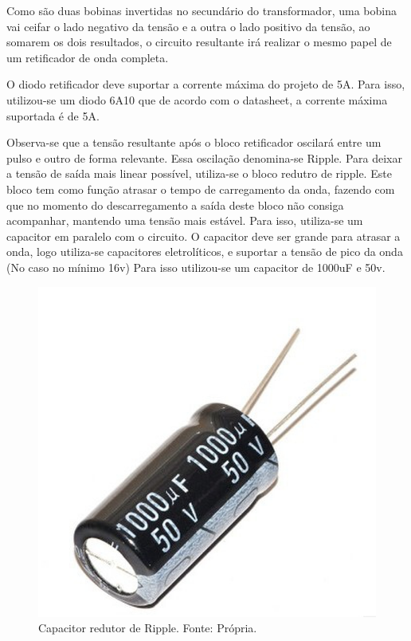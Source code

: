         Como são duas bobinas invertidas no secundário do transformador, uma bobina 					vai ceifar o lado negativo da tensão e a outra o lado positivo da tensão, ao 					somarem os dois resultados, o circuito resultante irá realizar o mesmo papel 					de um retificador de onda completa.
        
        O diodo retificador deve suportar a corrente máxima do projeto de 5A. Para 						isso, utilizou-se um diodo 6A10 que de acordo com o datasheet, a corrente 						máxima suportada é de 5A.
        
        Observa-se que a tensão resultante após o bloco retificador oscilará entre um 					pulso e outro de forma relevante. Essa oscilação denomina-se Ripple. Para 						deixar a tensão de saída mais linear possível, utiliza-se o bloco redutro de 					ripple. Este bloco  tem como função atrasar o tempo de carregamento da onda, 					fazendo com que no momento do descarregamento a saída deste bloco não consiga 					acompanhar, mantendo uma tensão mais estável. Para isso, utiliza-se um 							capacitor em paralelo com o circuito. O capacitor deve ser grande para atrasar 				a onda, logo utiliza-se capacitores eletrolíticos, e suportar a tensão de pico 				da onda (No caso no mínimo 16v) Para isso utilizou-se um capacitor de 1000uF e 				50v.

        \begin{figure}[!htb]
            \centering
            \includegraphics[scale= 0.2]{figuras/Capacitor.jpg}
            \caption{Capacitor redutor de Ripple. Fonte: Própria.}
            \label{capacitor}
        \end{figure}
        
